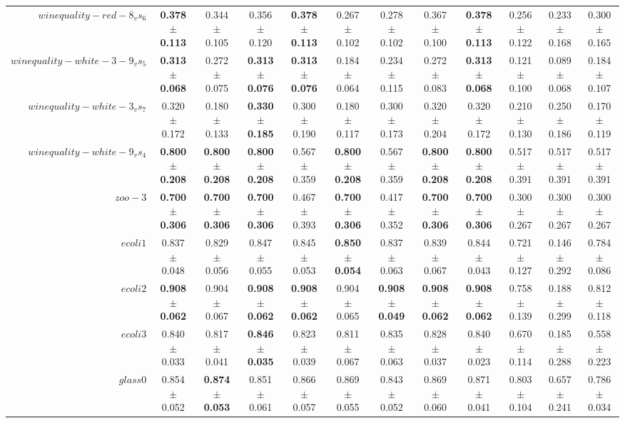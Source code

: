 \begin{table}[!ht]
{\begin{tabular}{r c c c c c c c c c c c}
$winequality-red-8_vs_6$ & \textbf{0.378 $\pm$ 0.113} & 0.344 $\pm$ 0.105 & 0.356 $\pm$ 0.120 & \textbf{0.378 $\pm$ 0.113} & 0.267 $\pm$ 0.102 & 0.278 $\pm$ 0.102 & 0.367 $\pm$ 0.100 & \textbf{0.378 $\pm$ 0.113} & 0.256 $\pm$ 0.122 & 0.233 $\pm$ 0.168 & 0.300 $\pm$ 0.165 \\
$winequality-white-3-9_vs_5$ & \textbf{0.313 $\pm$ 0.068} & 0.272 $\pm$ 0.075 & \textbf{0.313 $\pm$ 0.076} & \textbf{0.313 $\pm$ 0.076} & 0.184 $\pm$ 0.064 & 0.234 $\pm$ 0.115 & 0.272 $\pm$ 0.083 & \textbf{0.313 $\pm$ 0.068} & 0.121 $\pm$ 0.100 & 0.089 $\pm$ 0.068 & 0.184 $\pm$ 0.107 \\
$winequality-white-3_vs_7$ & 0.320 $\pm$ 0.172 & 0.180 $\pm$ 0.133 & \textbf{0.330 $\pm$ 0.185} & 0.300 $\pm$ 0.190 & 0.180 $\pm$ 0.117 & 0.300 $\pm$ 0.173 & 0.320 $\pm$ 0.204 & 0.320 $\pm$ 0.172 & 0.210 $\pm$ 0.130 & 0.250 $\pm$ 0.186 & 0.170 $\pm$ 0.119 \\
$winequality-white-9_vs_4$ & \textbf{0.800 $\pm$ 0.208} & \textbf{0.800 $\pm$ 0.208} & \textbf{0.800 $\pm$ 0.208} & 0.567 $\pm$ 0.359 & \textbf{0.800 $\pm$ 0.208} & 0.567 $\pm$ 0.359 & \textbf{0.800 $\pm$ 0.208} & \textbf{0.800 $\pm$ 0.208} & 0.517 $\pm$ 0.391 & 0.517 $\pm$ 0.391 & 0.517 $\pm$ 0.391 \\
$zoo-3$ & \textbf{0.700 $\pm$ 0.306} & \textbf{0.700 $\pm$ 0.306} & \textbf{0.700 $\pm$ 0.306} & 0.467 $\pm$ 0.393 & \textbf{0.700 $\pm$ 0.306} & 0.417 $\pm$ 0.352 & \textbf{0.700 $\pm$ 0.306} & \textbf{0.700 $\pm$ 0.306} & 0.300 $\pm$ 0.267 & 0.300 $\pm$ 0.267 & 0.300 $\pm$ 0.267 \\
$ecoli1$ & 0.837 $\pm$ 0.048 & 0.829 $\pm$ 0.056 & 0.847 $\pm$ 0.055 & 0.845 $\pm$ 0.053 & \textbf{0.850 $\pm$ 0.054} & 0.837 $\pm$ 0.063 & 0.839 $\pm$ 0.067 & 0.844 $\pm$ 0.043 & 0.721 $\pm$ 0.127 & 0.146 $\pm$ 0.292 & 0.784 $\pm$ 0.086 \\
$ecoli2$ & \textbf{0.908 $\pm$ 0.062} & 0.904 $\pm$ 0.067 & \textbf{0.908 $\pm$ 0.062} & \textbf{0.908 $\pm$ 0.062} & 0.904 $\pm$ 0.065 & \textbf{0.908 $\pm$ 0.049} & \textbf{0.908 $\pm$ 0.062} & \textbf{0.908 $\pm$ 0.062} & 0.758 $\pm$ 0.139 & 0.188 $\pm$ 0.299 & 0.812 $\pm$ 0.118 \\
$ecoli3$ & 0.840 $\pm$ 0.033 & 0.817 $\pm$ 0.041 & \textbf{0.846 $\pm$ 0.035} & 0.823 $\pm$ 0.039 & 0.811 $\pm$ 0.067 & 0.835 $\pm$ 0.063 & 0.828 $\pm$ 0.037 & 0.840 $\pm$ 0.023 & 0.670 $\pm$ 0.114 & 0.185 $\pm$ 0.288 & 0.558 $\pm$ 0.223 \\
$glass0$ & 0.854 $\pm$ 0.052 & \textbf{0.874 $\pm$ 0.053} & 0.851 $\pm$ 0.061 & 0.866 $\pm$ 0.057 & 0.869 $\pm$ 0.055 & 0.843 $\pm$ 0.052 & 0.869 $\pm$ 0.060 & 0.871 $\pm$ 0.041 & 0.803 $\pm$ 0.104 & 0.657 $\pm$ 0.241 & 0.786 $\pm$ 0.034 \\

\end{tabular}}
\end{table}
